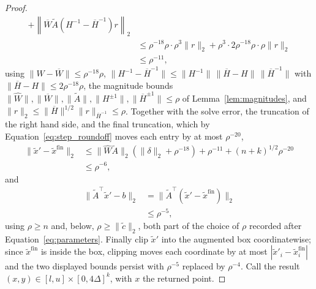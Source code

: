 \documentclass[11pt]{article}
\begin{document}
\begin{proof}
\[\begin{aligned}
+ \left\| \overline W \widetilde A
\left( H^{-1} - \overline H^{-1} \right) r \right\|_2
\\
&\le
\rho^{-18} \rho \cdot \rho^{3} \|r\|_2
+ \rho^{3} \cdot 2 \rho^{-18} \rho \cdot \rho \|r\|_2
\\
&\le
\rho^{-11},
\end{aligned}
\]
using $\|\widehat W - \overline W\| \le \rho^{-18} \rho$,
$\|H^{-1} - \overline H^{-1}\| \le \|H^{-1}\| \, \|\overline H - H\| \, \|\overline H^{-1}\|$
with $\|\overline H - H\| \le 2 \rho^{-18} \rho$,
the magnitude bounds
$\|\widehat W\|, \|\overline W\|, \|\widetilde A\|, \|H^{\pm 1}\|, \|\overline H^{\pm 1}\| \le \rho$
of Lemma~\ref{lem:magnitudes}, and
$\|r\|_2 \le \|\overline H\|^{1/2} \|r\|_{\overline H^{-1}} \le \rho$.
Together with the solve error, the truncation of the right hand
side, and the final truncation, which by Equation~\eqref{eq:step_roundoff}
moves each entry by at most
$\rho^{-20}$,
\[
\begin{aligned}
\| \widetilde x' - \widetilde x^{\mathrm{fin}} \|_2
&\le
\| \widehat W \widetilde A \|_2 \left( \|\delta\|_2 + \rho^{-18} \right)
+ \rho^{-11}
+ (n + k)^{1/2} \rho^{-20}
\\
&\le
\rho^{-6},
\end{aligned}
\]
and
\[
\begin{aligned}
\| \widetilde A^\top \widetilde x' - b \|_2
&=
\| \widetilde A^\top ( \widetilde x' - \widetilde x^{\mathrm{fin}} ) \|_2
\\
&\le
\rho^{-5},
\end{aligned}
\]
using $\rho \ge n$ and, below,
$\rho \ge \|\widetilde c\|_2$, both part of the choice of $\rho$ recorded
after Equation~\eqref{eq:parameters}. Finally clip
$\widetilde x'$ into the augmented box coordinatewise; since
$\widetilde x^{\mathrm{fin}}$ is inside the box, clipping moves each
coordinate by at most $|\widetilde x'_i - \widetilde x^{\mathrm{fin}}_i|$
and the two displayed bounds persist with $\rho^{-5}$ replaced by
$\rho^{-4}$. Call the result
$(x, y) \in [l, u] \times [0, 4 \Delta]^{k}$, with
$x$ the returned point.


\end{proof}
\end{document}
